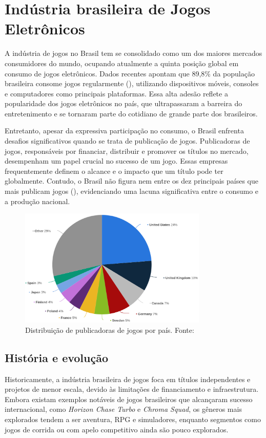 \chapter{Indústria brasileira de Jogos Eletrônicos}

A indústria de jogos no Brasil tem se consolidado como um dos maiores mercados consumidores do mundo, ocupando atualmente a quinta posição global em consumo de jogos eletrônicos. Dados recentes apontam que 89,8\% da população brasileira consome jogos regularmente (\cite{internetGame:share}), utilizando dispositivos móveis, consoles e computadores como principais plataformas. Essa alta adesão reflete a popularidade dos jogos eletrônicos no país, que ultrapassaram a barreira do entretenimento e se tornaram parte do cotidiano de grande parte dos brasileiros.

Entretanto, apesar da expressiva participação no consumo, o Brasil enfrenta desafios significativos quando se trata de publicação de jogos. Publicadoras de jogos, responsáveis por financiar, distribuir e promover os títulos no mercado, desempenham um papel crucial no sucesso de um jogo. Essas empresas frequentemente definem o alcance e o impacto que um título pode ter globalmente. Contudo, o Brasil não figura nem entre os dez principais países que mais publicam jogos (\cite{publishers:country}), evidenciando uma lacuna significativa entre o consumo e a produção nacional.

\begin{figure}[H]
    \centering
    \includegraphics[width=0.8\textwidth]{figuras/Devs by Country.png}
    \caption{Distribuição de publicadoras de jogos por país. Fonte: \cite{publishers:country}}
    \label{fig:jogos-brasil}
\end{figure}

\section{História e evolução}
Historicamente, a indústria brasileira de jogos foca em títulos independentes e projetos de menor escala, devido às limitações de financiamento e infraestrutura. Embora existam exemplos notáveis de jogos brasileiros que alcançaram sucesso internacional, como \textit{Horizon Chase Turbo}\label{Língua estrangeira} e \textit{Chroma Squad}, os gêneros mais explorados tendem a ser aventura, RPG e simuladores, enquanto segmentos como jogos de corrida ou com apelo competitivo ainda são pouco explorados.

